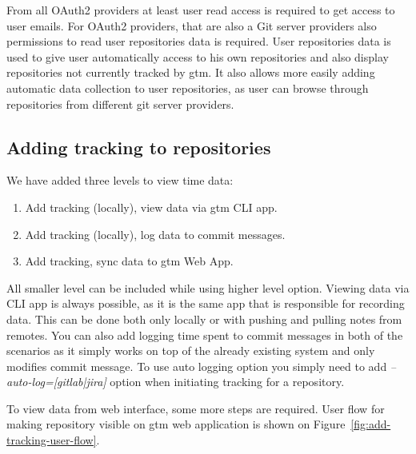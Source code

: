 From all OAuth2 providers at least user read access is required to get access to user emails.
For OAuth2 providers, that are also a Git server providers also permissions to read user repositories data is required.
User repositories data is used to give user automatically access to his own repositories and also display repositories
not currently tracked by gtm.
It also allows more easily adding automatic data collection to user repositories, as user can browse through
repositories from different git server providers.

\subsection{Adding tracking to repositories}\label{subsec:adding-tracking}
We have added three levels to view time data:
\begin{enumerate}
    \item Add tracking (locally), view data via gtm CLI app.
    \item Add tracking (locally), log data to commit messages.
    \item Add tracking, sync data to gtm Web App.
\end{enumerate}

All smaller level can be included while using higher level option.
Viewing data via CLI app is always possible, as it is the same app that is responsible for recording data.
This can be done both only locally or with pushing and pulling notes from remotes.
You can also add logging time spent to commit messages in both of the scenarios as it simply works on top of the already
existing system and only modifies commit message.
To use auto logging option you simply need to add \textit{--auto-log=[gitlab|jira]} option when initiating tracking for a repository.

To view data from web interface, some more steps are required.
User flow for making repository visible on gtm web application is shown on Figure~\ref{fig:add-tracking-user-flow}.

